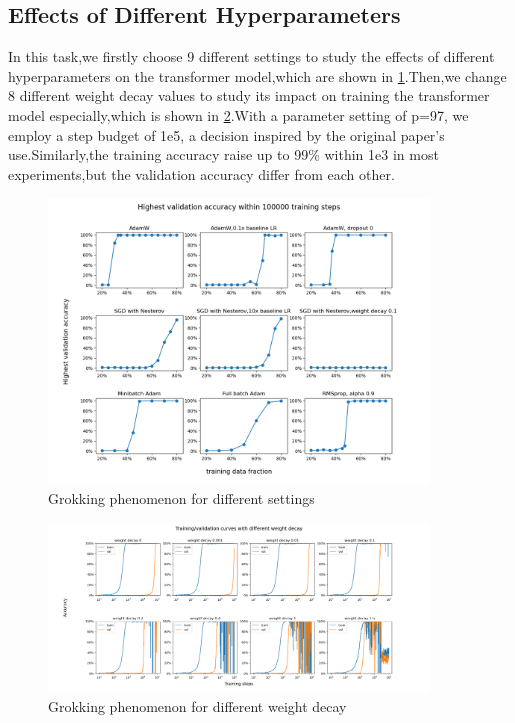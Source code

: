 \subsection{Effects of Different Hyperparameters}
\label{sec:subtask3}

In this task,we firstly choose 9 different settings to study the effects of different hyperparameters on the transformer model,which are shown in \cref{fig:different_settings}.Then,we change 8 different weight decay values to study its impact on training the transformer model especially,which is shown in \cref{fig:different weight_decay}.With a parameter setting of p=97, we employ a step budget of 1e5, a decision inspired by the original paper's use.Similarly,the training accuracy raise up to 99\% within 1e3 in most experiments,but the validation accuracy differ from each other.

\begin{figure}[!ht]
    \centering
    \includegraphics[width=0.9\textwidth]{fig/different_settings/different_settings.png}
    \caption{Grokking phenomenon for different settings}
    \label{fig:different_settings}
\end{figure}
\begin{figure}[!ht]
    \centering
    \includegraphics[width=0.9\textwidth]{fig/weight_decay/weight_decay.png}
    \caption{Grokking phenomenon for different weight decay}
    \label{fig:different weight_decay}
\end{figure}

